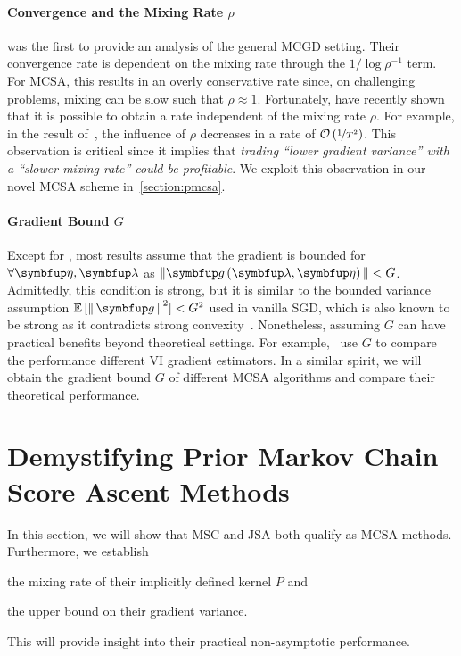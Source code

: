 \vspace{-0.1in}
\paragraph{Convergence and the Mixing Rate \(\rho\)}
\citet{duchi_ergodic_2012} was the first to provide an analysis of the general MCGD setting.
Their convergence rate is dependent on the mixing rate through the \(1 / \log \rho^{-1}\) term.
For MCSA, this results in an overly conservative rate since, on challenging problems, mixing can be slow such that \(\rho \approx 1\).
Fortunately, \citet{doan_convergence_2020,doan_finitetime_2020} have recently shown that it is possible to obtain a rate independent of the mixing rate \(\rho\).
For example, in the result of~\citet{doan_finitetime_2020}, the influence of \(\rho\) decreases in a rate of \(\mathcal{O}\left(\nicefrac{1}{T^2}\right)\).
This observation is critical since it implies that \textit{trading ``lower gradient variance'' with a ``slower mixing rate'' could be profitable}.
We exploit this observation in our novel MCSA scheme in~\cref{section:pmcsa}.

\vspace{-0.1in}
\paragraph{Gradient Bound \(G\)}
Except for \citet{doan_finitetime_2020}, most results assume that the gradient is bounded for \(\forall\veta,\vlambda\) as {\footnotesize\( {\| \vg\left(\vlambda, \veta\right) \|} < G \)}.
Admittedly, this condition is strong, but it is similar to the bounded variance assumption {\footnotesize\(\mathbb{E}\,[\norm{\vg}^2]  < G^2\)} used in vanilla SGD, which is also known to be strong as it contradicts strong convexity~\citep{pmlr-v80-nguyen18c}.
Nonetheless, assuming \(G\) can have practical benefits beyond theoretical settings.
For example,~\citet{pmlr-v108-geffner20a} use \(G\) to compare the performance different VI gradient estimators.
In a similar spirit, we will obtain the gradient bound \(G\) of different MCSA algorithms and compare their theoretical performance.

\vspace{-0.1in}
\section{Demystifying Prior Markov Chain Score Ascent Methods}\label{section:comparison}
\vspace{-0.1in}
In this section, we will show that MSC and JSA both qualify as MCSA methods.
Furthermore, we establish 
\begin{enumerate*}[label=\textbf{(\roman*)}]
  \item the mixing rate of their implicitly defined kernel \(P\) and
  \item the upper bound on their gradient variance.
\end{enumerate*}
This will provide insight into their practical non-asymptotic performance.

